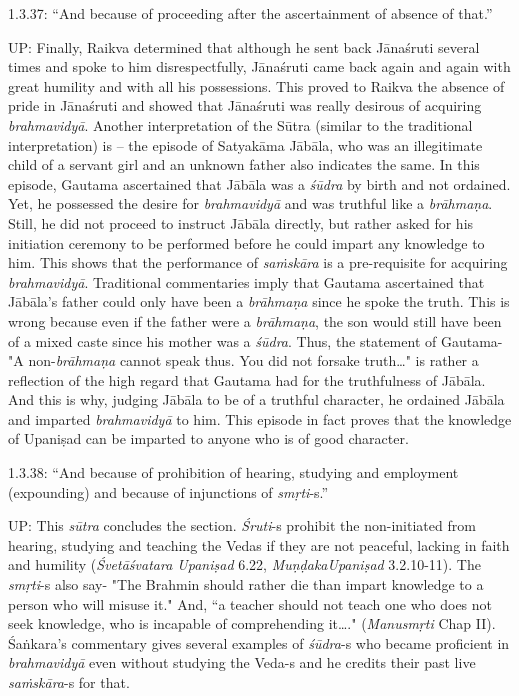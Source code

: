 1.3.37: “And because of proceeding after the ascertainment of absence of that.”

UP: Finally, Raikva determined that although he sent back Jānaśruti several times and spoke to him disrespectfully, Jānaśruti came back again and again with great humility and with all his possessions. This proved to Raikva the absence of pride in Jānaśruti and showed that Jānaśruti was really desirous of acquiring \textit{brahmavidyā}. Another interpretation of the Sūtra (similar to the traditional interpretation) is – the episode of Satyakāma Jābāla, who was an illegitimate child of a servant girl and an unknown father also indicates the same. In this episode, Gautama ascertained that Jābāla was a \textit{śūdra} by birth and not ordained. Yet, he possessed the desire for \textit{brahmavidyā} and was truthful like a \textit{brāhmaṇa}. Still, he did not proceed to instruct Jābāla directly, but rather asked for his initiation ceremony to be performed before he could impart any knowledge to him. This shows that the performance of \textit{saṁskāra} is a pre-requisite for acquiring \textit{brahmavidyā}. Traditional commentaries imply that Gautama ascertained that Jābāla's father could only have been a \textit{brāhmaṇa} since he spoke the truth. This is wrong because even if the father were a \textit{brāhmaṇa}, the son would still have been of a mixed caste since his mother was a \textit{śūdra}. Thus, the statement of Gautama- "A non-\textit{brāhmaṇa} cannot speak thus. You did not forsake truth…" is rather a reflection of the high regard that Gautama had for the truthfulness of Jābāla. And this is why, judging Jābāla to be of a truthful character, he ordained Jābāla and imparted \textit{brahmavidyā} to him. This episode in fact proves that the knowledge of Upaniṣad can be imparted to anyone who is of good character.

1.3.38: “And because of prohibition of hearing, studying and employment (expounding) and because of injunctions of \textit{smṛti}-s.”

UP: This \textit{sūtra} concludes the section. \textit{Śruti}-s prohibit the non-initiated from hearing, studying and teaching the Vedas if they are not peaceful, lacking in faith and humility (\textit{Śvetāśvatara Upaniṣad } 6.22, \textit{MuṇḍakaUpaniṣad }3.2.10-11). The \textit{smṛti}-s also say- "The Brahmin should rather die than impart knowledge to a person who will misuse it." And, “a teacher should not teach one who does not seek knowledge, who is incapable of comprehending it…." (\textit{Manusmṛti} Chap II). Śaṅkara’s commentary gives several examples of \textit{śūdra}-s who became proficient in \textit{brahmavidyā} even without studying the Veda-s and he credits their past live \textit{saṁskāra}-s for that.


